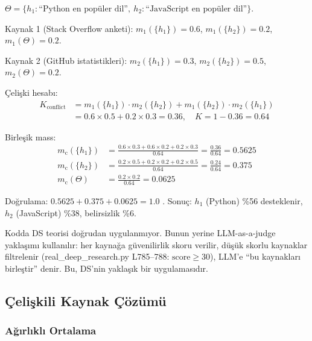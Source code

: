 \begin{ornek}
$\Theta = \{h_1: \text{``Python en pop\"{u}ler dil''},\ h_2: \text{``JavaScript en pop\"{u}ler dil''}\}$.

Kaynak 1 (Stack Overflow anketi): $m_1(\{h_1\}) = 0.6$, $m_1(\{h_2\}) = 0.2$, $m_1(\Theta) = 0.2$.

Kaynak 2 (GitHub istatistikleri): $m_2(\{h_1\}) = 0.3$, $m_2(\{h_2\}) = 0.5$, $m_2(\Theta) = 0.2$.

\c{C}eli\c{s}ki hesab{\i}:
\begin{align*}
K_{\text{conflict}} &= m_1(\{h_1\}) \cdot m_2(\{h_2\}) + m_1(\{h_2\}) \cdot m_2(\{h_1\}) \\
&= 0.6 \times 0.5 + 0.2 \times 0.3 = 0.36, \quad K = 1 - 0.36 = 0.64
\end{align*}

Birle\c{s}ik mass:
\begin{align*}
m_{\text{c}}(\{h_1\}) &= \frac{0.6 \times 0.3 + 0.6 \times 0.2 + 0.2 \times 0.3}{0.64} = \frac{0.36}{0.64} = 0.5625 \\
m_{\text{c}}(\{h_2\}) &= \frac{0.2 \times 0.5 + 0.2 \times 0.2 + 0.2 \times 0.5}{0.64} = \frac{0.24}{0.64} = 0.375 \\
m_{\text{c}}(\Theta)   &= \frac{0.2 \times 0.2}{0.64} = 0.0625
\end{align*}

Do\u{g}rulama: $0.5625 + 0.375 + 0.0625 = 1.0$ \checkmark. Sonu\c{c}: $h_1$ (Python) \%56 desteklenir, $h_2$ (JavaScript) \%38, belirsizlik \%6.
\end{ornek}

\begin{dikkat}
Kodda DS teorisi do\u{g}rudan uygulanm{\i}yor. Bunun yerine LLM-as-a-judge yakla\c{s}{\i}m{\i} kullan{\i}l{\i}r: her kayna\u{g}a g\"{u}venilirlik skoru verilir, d\"{u}\c{s}\"{u}k skorlu kaynaklar filtrelenir (real\_deep\_research.py L785--788: $\text{score} \geq 30$), LLM'e ``bu kaynaklar{\i} birle\c{s}tir'' denir. Bu, DS'nin yakla\c{s}{\i}k bir uygulamasıd{\i}r.
\end{dikkat}

\subsection{\c{C}eli\c{s}kili Kaynak \c{C}\"{o}z\"{u}m\"{u}}

\subsubsection{A\u{g}{\i}rl{\i}kl{\i} Ortalama}

